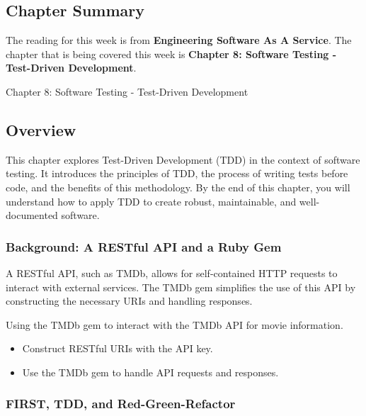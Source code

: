 \newpage

\subsection{Chapter Summary}

The reading for this week is from \textbf{Engineering Software As A Service}. The chapter that is being covered this week is \textbf{Chapter 8: Software Testing - Test-Driven Development}.

\begin{notes}{Chapter 8: Software Testing - Test-Driven Development}
    \subsection*{Overview}

    This chapter explores Test-Driven Development (TDD) in the context of software testing. It introduces the principles of TDD, the process of writing tests before code, and the benefits of this 
    methodology. By the end of this chapter, you will understand how to apply TDD to create robust, maintainable, and well-documented software.
    
    \subsubsection*{Background: A RESTful API and a Ruby Gem}
    
    A RESTful API, such as TMDb, allows for self-contained HTTP requests to interact with external services. The TMDb gem simplifies the use of this API by constructing the necessary URIs and handling responses.
    
    \begin{highlight}
    
        Using the TMDb gem to interact with the TMDb API for movie information.
        
        \begin{itemize}
            \item Construct RESTful URIs with the API key.
            \item Use the TMDb gem to handle API requests and responses.
        \end{itemize}
    
    \end{highlight}
    
    \subsubsection*{FIRST, TDD, and Red-Green-Refactor}
    

\end{notes}
